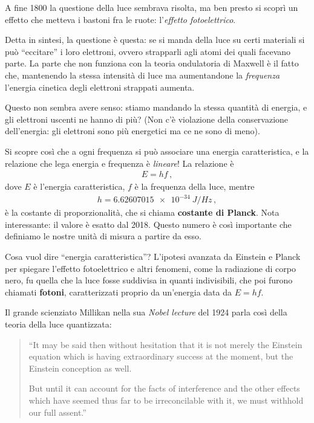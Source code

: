 \documentclass[a4paper,12pt]{article}
\begin{document}

A fine 1800 la questione della luce sembrava risolta, ma ben presto si scoprì un effetto che metteva i bastoni fra le ruote: l'\emph{effetto fotoelettrico}.

Detta in sintesi, la questione è questa: se si manda della luce su certi materiali si può ``eccitare'' i loro elettroni, ovvero strapparli agli atomi dei quali facevano parte.
La parte che non funziona con la teoria ondulatoria di Maxwell è il fatto che, mantenendo la stessa intensità di luce ma aumentandone la \emph{frequenza} l'energia cinetica degli elettroni strappati aumenta. 

Questo non sembra avere senso: stiamo mandando la stessa quantità di energia, e gli elettroni uscenti ne hanno di più? 
(Non c'è violazione della conservazione dell'energia: gli elettroni sono più energetici ma ce ne sono di meno).

Si scopre così che a ogni frequenza si può associare una energia caratteristica, e la relazione che lega energia e frequenza è \emph{lineare}! La relazione è 
%
\begin{align}
E = h f
\,,
\end{align}
%
dove \(E\) è l'energia caratteristica, \(f\) è la frequenza della luce, mentre 
%
\begin{align}
h = \SI{6.62607015e-34}{J / Hz}
\,,
\end{align}
%
è la costante di proporzionalità, che si chiama \textbf{costante di Planck}. 
Nota interessante: il valore è esatto dal 2018. Questo numero è così importante che definiamo le nostre unità di misura a partire da esso.

Cosa vuol dire ``energia caratteristica''? 
L'ipotesi avanzata da Einstein e Planck per spiegare l'effetto fotoelettrico e altri fenomeni, come la radiazione di corpo nero, fu quella che la luce fosse suddivisa in quanti indivisibili, che poi furono chiamati \textbf{fotoni}, caratterizzati proprio da un'energia data da \(E = hf\). 

Il grande scienziato Millikan nella sua \emph{Nobel lecture} del 1924
\autocite[]{millikanRobertMillikanNobel1924} parla così della teoria della luce quantizzata: 

\begin{quotation}
``It may be said then without hesitation that it
is not merely the Einstein equation which is having extraordinary success at
the moment, but the Einstein conception as well.

But until it can account for the facts of interference and the other effects
which have seemed thus far to be irreconcilable with it, we must withhold
our full assent.''
\end{quotation}
\end{document}
